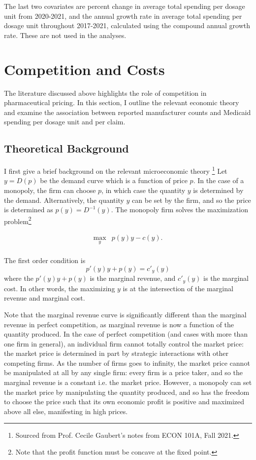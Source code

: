 The last two covariates are percent change in average total spending per dosage unit from 2020-2021, and the annual growth rate in average total spending per dosage unit throughout 2017-2021, calculated using the compound annual growth rate. These are not used in the analyses. 

\section{Competition and Costs}
The literature discussed above highlights the role of competition in pharmaceutical pricing. In this section, I outline the relevant economic theory and examine the association between reported manufacturer counts and Medicaid spending per dosage unit and per claim.
\subsection{Theoretical Background}
I first give a brief background on the relevant microeconomic theory \footnote{Sourced from Prof. Cecile Gaubert's notes from ECON 101A, Fall 2021.} Let $y = D(p)$ be the demand curve which is a function of price $p$. In the case of a monopoly, the firm can choose $p$, in which case the quantity $y$ is determined by the demand. Alternatively, the quantity $y$ can be set by the firm, and so the price is determined as $p(y) = D^{-1}(y)$. The monopoly firm solves the maximization problem\footnote{Note that the profit function must be concave at the fixed point.}

\begin{equation}
\begin{array}{rrclcl}
\displaystyle \max_{y} & p(y)y - c(y).\\
\end{array}
\end{equation}

The first order condition is $$ p'(y)y + p(y) = c'_y(y)$$ where the $p'(y)y + p(y)$ is the marginal revenue, and $c'_y(y)$ is the marginal cost. In other words, the maximizing $y$ is at the intersection of the marginal revenue and marginal cost. 

Note that the marginal revenue curve is significantly different than the marginal revenue in perfect competition, as marginal revenue is now a function of the quantity produced. In the case of perfect competition (and cases with more than one firm in general), an individual firm cannot totally control the market price: the market price is determined in part by strategic interactions with other competing firms. As the number of firms goes to infinity, the market price cannot be manipulated at all by any single firm: every firm is a price taker, and so the marginal revenue is a constant i.e. the market price. However, a monopoly can set the market price by manipulating the quantity produced, and so has the freedom to choose the price such that its own economic profit is positive and maximized above all else, manifesting in high prices.

